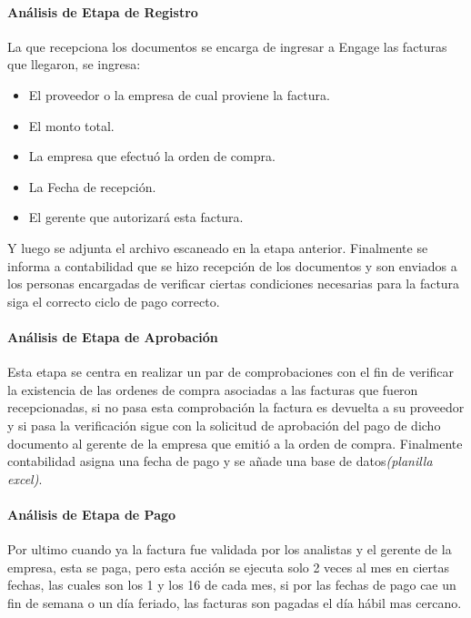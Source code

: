 	\paragraph{Análisis de Etapa de Registro}
	 La que recepciona los documentos se encarga de ingresar a Engage las facturas que llegaron, se ingresa:
				
	\begin{itemize}
		\item El proveedor o la empresa de cual proviene la factura.
		\item El monto total.
		\item La empresa que efectuó la orden de compra.
		\item La Fecha de recepción.
		\item El gerente que autorizará esta factura.
	\end{itemize}
			
	\par
	Y luego se adjunta el archivo escaneado en la etapa anterior. Finalmente se informa a contabilidad que se hizo recepción de los documentos y son enviados a los personas encargadas  de verificar ciertas condiciones necesarias para la factura siga el correcto ciclo de pago correcto.
		
	\paragraph{Análisis de Etapa de Aprobación} 
	Esta etapa se centra en realizar un par de comprobaciones con el fin de verificar la existencia de las ordenes de compra asociadas a las facturas que fueron recepcionadas, si no pasa esta comprobación la factura es devuelta a su proveedor y si pasa la verificación sigue con la  solicitud de aprobación del pago de dicho documento al gerente de la empresa que emitió a la orden de compra. Finalmente contabilidad asigna una fecha de pago y se añade una base de datos\textit{(planilla excel)}.
			
	\paragraph{Análisis de Etapa de Pago} 
	Por ultimo cuando ya la factura fue validada por los analistas y el gerente de la empresa, esta se paga, pero esta acción se ejecuta solo 2 veces al mes en ciertas fechas, las cuales son los 1 y los 16 de cada mes, si por las fechas de pago cae un fin de semana o un día feriado, las facturas son pagadas el día hábil mas cercano.
			
			
	